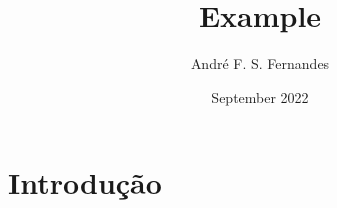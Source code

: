 \documentclass{article}
\title{Example}
\author{André F. S. Fernandes}
\date{September 2022}
\begin{document}
\maketitle

\section{Introdução}
\end{document}
